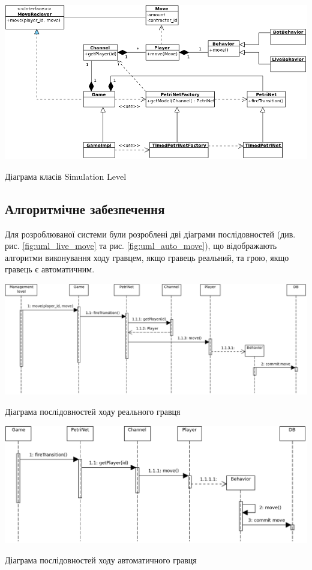 \begin{stdfigure}
    \includegraphics[width=7in]{images/uml/simulation_level.png}
    \caption{Діаграма класів Simulation Level}
    \label{fig:uml_simulation}
\end{stdfigure}   

\subsection{Алгоритмічне забезпечення}
Для розроблюваної системи були розроблені дві діаграми послідовностей (див. рис. \ref{fig:uml_live_move} та рис. \ref{fig:uml_auto_move}), що відображають алгоритми виконування ходу гравцем, якщо гравець реальний, та грою, якщо гравець є автоматичним.
\begin{stdfigure}
    \includegraphics[width=7in]{images/uml/live_move.png}
    \caption{Діаграма послідовностей ходу реального гравця}
    \label{fig:uml_live_move}
\end{stdfigure}   

\begin{stdfigure}
    \includegraphics[width=7in]{images/uml/automate_move.png}
    \caption{Діаграма послідовностей ходу автоматичного гравця}
    \label{fig:uml_auto_move}
\end{stdfigure}   

